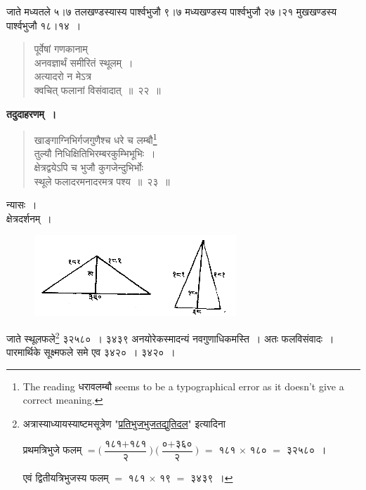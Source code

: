 \documentclass[11pt, openany]{book}
\begin{document}
 जाते मध्यतले ५\;।\;७ तलखण्डस्यास्य पार्श्वभुजौ ९\;।\;७
मध्यखण्डस्य पार्श्वभुजौ २७\;।\;२१ मुखखण्डस्य पार्श्वभुजौ
१८\;।\;१४~। 
\vspace{2mm}

\begin{quote}
    \bs 
     पूर्वेषां गणकानाम् \\
     अनवज्ञार्थं समीरितं स्थूलम्~।\\
अत्यादरो न मेऽत्र \\
क्वचित् फलानां विसंवादात्~॥~२२~॥
\end{quote}

 \textbf{तदुदाहरणम्~।} 
\begin{quote}
    \bqt 
     खाङ्गाग्निभिर्गजगुणैश्च धरे च लम्बौ\footnote{The reading धरावलम्बौ seems to be a typographical error as it doesn't give a correct meaning.} \\
     तुल्यौ निधिक्षितिभिरम्बरकुम्भिभूभिः~।\\
क्षेत्रद्वयेऽपि च भुजौ कुगजेन्दुभिर्भोः \\
स्थूले फलादरमनादरमत्र पश्य~॥~२३~॥
\end{quote}
\newpage
 न्यासः~। \\
\indent क्षेत्रदर्शनम्~। 
 \vspace{-2mm}
 
 \begin{figure}[h!]
    \centering
  \captionsetup{labelformat=empty}
 \includegraphics[scale=0.8]{graphics/capture28.png}
\end{figure}
 \vspace{-2mm}

\setcounter{footnote}{0}
 जाते स्थूलफले\footnote{अत्रास्याध्यायस्याष्टमसूत्रेण "\hyperref[4.8]{प्रतिभुजभुजतद्युतिदल}"
इत्यादिना 
 \vspace{2mm}

\hspace{6mm} प्रथमत्रिभुजे फलम् $=
\bigg(\dfrac{\mbox{१८१} + \mbox{१८१}}{\mbox{२}}\bigg)\ \bigg(\dfrac{\mbox{०} + \mbox{३६०}}{\mbox{२}}\bigg)$
$=$ १८१ $\times$ १८० $=$ ३२५८०~।
 \vspace{1mm}

\hspace{6mm} एवं द्वितीयत्रिभुजस्य फलम् $=$
१८१ $\times$ १९ $=$ ३४३९~। } ३२५८०~। ३४३९ अनयोरेकस्मादन्यं नवगुणाधिकमस्ति~। अतः फलविसंवादः~। पारमार्थिके सूक्ष्मफले
समे एव ३४२०~। ३४२०~। 
\end{document}
